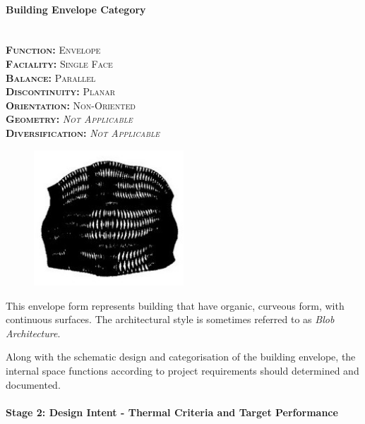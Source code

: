 \setlength{\columnseprule}{0pt}
\begin{multicols}{2}
	\paragraph{Building Envelope Category}\mbox{}\\
	\vspace {0.5cm}	
	\small \textsc{\textbf{Function:} Envelope\\
	\vspace {0.3cm}
	\textbf{Faciality:} Single Face\\
	\vspace {0.3cm}
	\textbf{Balance:} Parallel\\
	\vspace {0.3cm}
	\textbf{Discontinuity:} Planar\\
	\vspace {0.3cm}
	\textbf{Orientation:} Non-Oriented\\
	\vspace {0.3cm}
	\textbf{Geometry:} \emph{Not Applicable}\\
	\vspace {0.3cm}
	\textbf{Diversification:} \emph{Not Applicable}\\}
	\normalsize
	\columnbreak
	\vspace{3.5cm}
	\begin{figure}[H]
		\centering
		\includegraphics[width=0.5\textwidth]{./Images/21-Envelope12}
	\end{figure}
\end{multicols}
\vspace{-5mm}

This envelope form represents building that have organic, curveous form, with continuous surfaces. The architectural style is sometimes referred to as \emph{Blob Architecture}.

Along with the schematic design and categorisation of the building envelope, the internal space functions according to project requirements should determined and documented.

\paragraph{Stage 2: Design Intent - Thermal Criteria and Target Performance}\mbox{}\\

